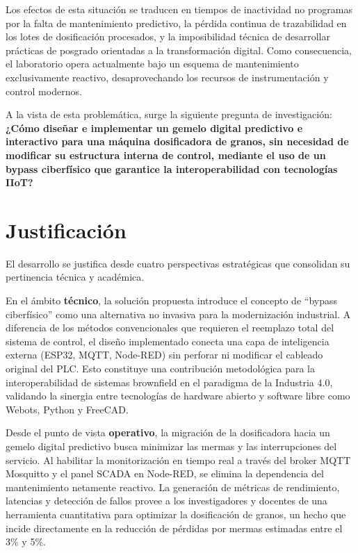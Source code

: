 Los efectos de esta situación se traducen en tiempos de inactividad no programas por la falta de mantenimiento predictivo, la pérdida continua de trazabilidad en los lotes de dosificación procesados, y la imposibilidad técnica de desarrollar prácticas de posgrado orientadas a la transformación digital. Como consecuencia, el laboratorio opera actualmente bajo un esquema de mantenimiento exclusivamente reactivo, desaprovechando los recursos de instrumentación y control modernos.

A la vista de esta problemática, surge la siguiente pregunta de investigación: \textbf{¿Cómo diseñar e implementar un gemelo digital predictivo e interactivo para una máquina dosificadora de granos, sin necesidad de modificar su estructura interna de control, mediante el uso de un bypass ciberfísico que garantice la interoperabilidad con tecnologías IIoT?}

\section{Justificación}

El desarrollo se justifica desde cuatro perspectivas estratégicas que consolidan su pertinencia técnica y académica.

En el ámbito \textbf{técnico}, la solución propuesta introduce el concepto de ``bypass ciberfísico'' como una alternativa no invasiva para la modernización industrial. A diferencia de los métodos convencionales que requieren el reemplazo total del sistema de control, el diseño implementado conecta una capa de inteligencia externa (ESP32, MQTT, Node-RED) sin perforar ni modificar el cableado original del PLC. Esto constituye una contribución metodológica para la interoperabilidad de sistemas brownfield en el paradigma de la Industria 4.0, validando la sinergia entre tecnologías de hardware abierto y software libre como Webots, Python y FreeCAD.

Desde el punto de vista \textbf{operativo}, la migración de la dosificadora hacia un gemelo digital predictivo busca minimizar las mermas y las interrupciones del servicio. Al habilitar la monitorización en tiempo real a través del broker MQTT Mosquitto y el panel SCADA en Node-RED, se elimina la dependencia del mantenimiento netamente reactivo. La generación de métricas de rendimiento, latencias y detección de fallos provee a los investigadores y docentes de una herramienta cuantitativa para optimizar la dosificación de granos, un hecho que incide directamente en la reducción de pérdidas por mermas estimadas entre el 3\% y 5\%.

